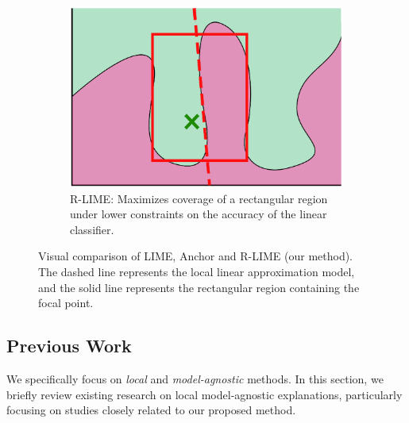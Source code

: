 \documentclass[runningheads]{llncs}
\begin{document}
\begin{figure}[tbp]
\begin{subfigure}[t]{0.3\textwidth}
    \centering
    \includegraphics[width=\textwidth]{visual-rlime3}
    \caption{%
      R-LIME\@:
      Maximizes coverage of a rectangular region
      under lower constraints on the accuracy of the linear classifier.
    }\label{fig:rlime}
  \end{subfigure}
  \caption[Visual comparison of LIME, Anchor and R-LIME]{%
    Visual comparison of LIME, Anchor and R-LIME (our method).
    The dashed line represents the local linear approximation model,
    and the solid line represents the rectangular region containing the focal point.
  }
\end{figure}

\subsection{Previous Work}
We specifically focus on \emph{local} and \emph{model-agnostic} methods.
In this section,
we briefly review existing research on local model-agnostic explanations,
particularly focusing on studies closely related to our proposed method.
\end{document}
